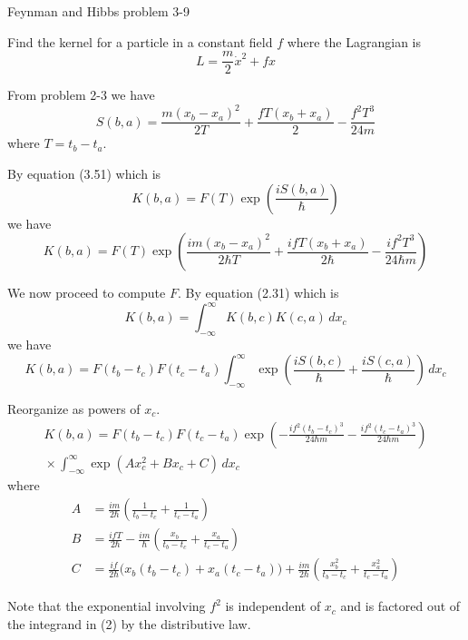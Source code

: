 \documentclass[12pt]{article}
\begin{document}
Feynman and Hibbs problem 3-9

\bigskip
Find the kernel for a particle in a constant field $f$
where the Lagrangian is
\begin{equation*}
L=\frac{m}{2}\dot x^2+fx
\end{equation*}

From problem 2-3 we have
\begin{equation*}
S(b,a)=\frac{m(x_b-x_a)^2}{2T}+\frac{fT(x_b+x_a)}{2}-\frac{f^2T^3}{24m}
\end{equation*}
where $T=t_b-t_a$.

\bigskip
By equation (3.51) which is
\begin{equation*}
K(b,a)=F(T)\exp\left(\frac{iS(b,a)}{\hbar}\right)
\end{equation*}
we have
\begin{equation*}
K(b,a)=
F(T)\exp\left(
\frac{im(x_b-x_a)^2}{2\hbar T}
+\frac{ifT(x_b+x_a)}{2\hbar}
-\frac{if^2T^3}{24\hbar m}
\right)
\tag{1}
\end{equation*}

We now proceed to compute $F$. By equation (2.31) which is
\begin{equation*}
K(b,a)=\int_{-\infty}^\infty K(b,c)K(c,a)\,dx_c
\end{equation*}
we have
\begin{equation*}
K(b,a)=F(t_b-t_c)F(t_c-t_a)\int_{-\infty}^\infty
\exp\left(\frac{iS(b,c)}{\hbar}+\frac{iS(c,a)}{\hbar}\right)
\,dx_c
\end{equation*}

Reorganize as powers of $x_c$.
\begin{multline*}
K(b,a)=F(t_b-t_c)F(t_c-t_a)
\exp\left(-\frac{if^2(t_b-t_c)^3}{24\hbar m}-\frac{if^2(t_c-t_a)^3}{24\hbar m}\right)
\\[1ex]
{}\times
\int_{-\infty}^\infty
\exp\left(Ax_c^2+Bx_c+C\right)
\,dx_c
\tag{2}
\end{multline*}
where
\begin{align*}
A&=\frac{im}{2\hbar}\left(\frac{1}{t_b-t_c}+\frac{1}{t_c-t_a}\right)
\tag{3}
\\
B&=\frac{ifT}{2\hbar}-\frac{im}{\hbar}\left(\frac{x_b}{t_b-t_c}+\frac{x_a}{t_c-t_a}\right)
\tag{4}
\\
C&=\frac{if}{2\hbar}\big(x_b(t_b-t_c)+x_a(t_c-t_a)\big)+\frac{im}{2\hbar}
\left(\frac{x_b^2}{t_b-t_c}+\frac{x_a^2}{t_c-t_a}\right)
\tag{5}
\end{align*}

\bigskip
Note that the exponential involving $f^2$ is independent of $x_c$
and is factored out of the integrand in (2) by the distributive law.
\end{document}

